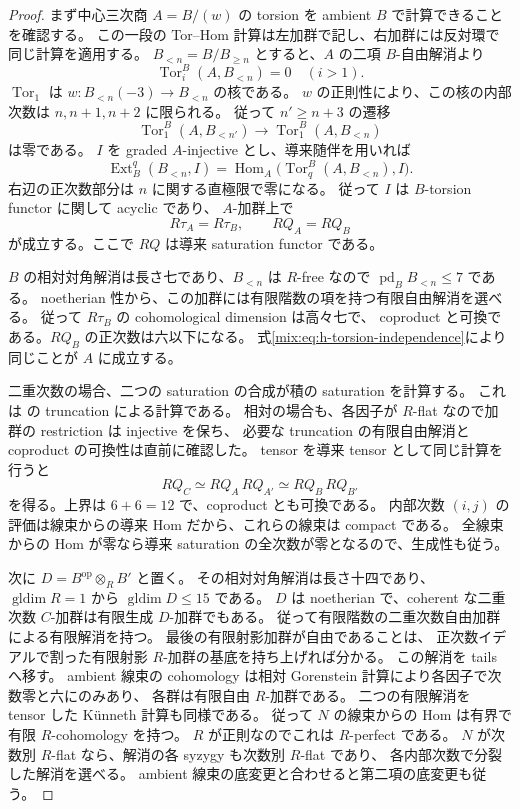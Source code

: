 \begin{proof}
まず中心三次商 $A=B/(w)$ の torsion を ambient $B$ で計算できることを確認する。
この一段の Tor--Hom 計算は左加群で記し、右加群には反対環で同じ計算を適用する。
$B_{<n}=B/B_{\ge n}$ とすると、$A$ の二項 $B$-自由解消より
\[
 \operatorname{Tor}_i^B(A,B_{<n})=0\quad(i>1).
\]
$\operatorname{Tor}_1$ は
$w:B_{<n}(-3)\to B_{<n}$ の核である。
$w$ の正則性により、この核の内部次数は $n,n+1,n+2$ に限られる。
従って $n'\ge n+3$ の遷移
\[
 \operatorname{Tor}_1^B(A,B_{<n'})
 \longrightarrow\operatorname{Tor}_1^B(A,B_{<n})
\]
は零である。
$I$ を graded $A$-injective とし、導来随伴を用いれば
\[
 \operatorname{Ext}_B^q(B_{<n},I)
 =\operatorname{Hom}_A
       \bigl(\operatorname{Tor}_q^B(A,B_{<n}),I\bigr).
\]
右辺の正次数部分は $n$ に関する直極限で零になる。
従って $I$ は $B$-torsion functor に関して acyclic であり、
$A$-加群上で
\begin{equation}\label{mix:eq:h-torsion-independence}
 R\tau_A=R\tau_B,\qquad RQ_A=RQ_B
\end{equation}
が成立する。ここで $RQ$ は導来 saturation functor である。

$B$ の相対対角解消は長さ七であり、$B_{<n}$ は $R$-free なので
$\operatorname{pd}_B B_{<n}\le7$ である。
noetherian 性から、この加群には有限階数の項を持つ有限自由解消を選べる。
従って $R\tau_B$ の cohomological dimension は高々七で、
coproduct と可換である。$RQ_B$ の正次数は六以下になる。
式\eqref{mix:eq:h-torsion-independence}により同じことが $A$ に成立する。

二重次数の場合、二つの saturation の合成が積の saturation を計算する。
これは \cite[Proposition~3.41]{CMOBallardFarman} の truncation による計算である。
相対の場合も、各因子が $R$-flat なので加群の restriction は injective を保ち、
必要な truncation の有限自由解消と coproduct の可換性は直前に確認した。
tensor を導来 tensor として同じ計算を行うと
\[
 RQ_C\simeq RQ_A\,RQ_{A'}
           \simeq RQ_B\,RQ_{B'}
\]
を得る。上界は $6+6=12$ で、coproduct とも可換である。
内部次数 $(i,j)$ の評価は線束からの導来 Hom だから、これらの線束は compact である。
全線束からの Hom が零なら導来 saturation の全次数が零となるので、生成性も従う。

次に $D=B^{\mathrm{op}}\otimes_RB'$ と置く。
その相対対角解消は長さ十四であり、
$\operatorname{gldim}R=1$ から $\operatorname{gldim}D\le15$ である。
$D$ は noetherian で、coherent な二重次数 $C$-加群は有限生成 $D$-加群でもある。
従って有限階数の二重次数自由加群による有限解消を持つ。
最後の有限射影加群が自由であることは、
正次数イデアルで割った有限射影 $R$-加群の基底を持ち上げれば分かる。
この解消を tails へ移す。
ambient 線束の cohomology は相対 Gorenstein 計算により各因子で次数零と六にのみあり、
各群は有限自由 $R$-加群である。
二つの有限解消を tensor した K\"unneth 計算も同様である。
従って $N$ の線束からの Hom は有界で有限 $R$-cohomology を持つ。
$R$ が正則なのでこれは $R$-perfect である。
$N$ が次数別 $R$-flat なら、解消の各 syzygy も次数別 $R$-flat であり、
各内部次数で分裂した解消を選べる。
ambient 線束の底変更と合わせると第二項の底変更も従う。


\end{proof}
